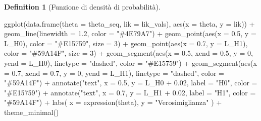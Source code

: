 \documentclass[
  letterpaper,
  DIV=11,
  numbers=noendperiod,
  oneside]{scrreprt}
\newenvironment{Shaded}{\begin{snugshade}}{\end{snugshade}}
\newcommand{\AttributeTok}[1]{\textcolor[rgb]{0.40,0.45,0.13}{#1}}
\newcommand{\DecValTok}[1]{\textcolor[rgb]{0.68,0.00,0.00}{#1}}
\newcommand{\FloatTok}[1]{\textcolor[rgb]{0.68,0.00,0.00}{#1}}
\newcommand{\FunctionTok}[1]{\textcolor[rgb]{0.28,0.35,0.67}{#1}}
\newcommand{\NormalTok}[1]{\textcolor[rgb]{0.00,0.23,0.31}{#1}}
\newcommand{\SpecialCharTok}[1]{\textcolor[rgb]{0.37,0.37,0.37}{#1}}
\newcommand{\StringTok}[1]{\textcolor[rgb]{0.13,0.47,0.30}{#1}}
\theoremstyle{definition}
\theoremstyle{plain}
\theoremstyle{definition}
\newtheorem{definition}{Definition}[chapter]
\theoremstyle{remark}
\begin{document}
\begin{definition}[Funzione di densità di
probabilità]
\begin{Shaded}
\begin{Highlighting}[]
\FunctionTok{ggplot}\NormalTok{(}\FunctionTok{data.frame}\NormalTok{(}\AttributeTok{theta =}\NormalTok{ theta\_seq, }\AttributeTok{lik =}\NormalTok{ lik\_vals), }\FunctionTok{aes}\NormalTok{(}\AttributeTok{x =}\NormalTok{ theta, }\AttributeTok{y =}\NormalTok{ lik)) }\SpecialCharTok{+}
  \FunctionTok{geom\_line}\NormalTok{(}\AttributeTok{linewidth =} \FloatTok{1.2}\NormalTok{, }\AttributeTok{color =} \StringTok{"\#4E79A7"}\NormalTok{) }\SpecialCharTok{+}
  \FunctionTok{geom\_point}\NormalTok{(}\FunctionTok{aes}\NormalTok{(}\AttributeTok{x =} \FloatTok{0.5}\NormalTok{, }\AttributeTok{y =}\NormalTok{ L\_H0), }\AttributeTok{color =} \StringTok{"\#E15759"}\NormalTok{, }\AttributeTok{size =} \DecValTok{3}\NormalTok{) }\SpecialCharTok{+}
  \FunctionTok{geom\_point}\NormalTok{(}\FunctionTok{aes}\NormalTok{(}\AttributeTok{x =} \FloatTok{0.7}\NormalTok{, }\AttributeTok{y =}\NormalTok{ L\_H1), }\AttributeTok{color =} \StringTok{"\#59A14F"}\NormalTok{, }\AttributeTok{size =} \DecValTok{3}\NormalTok{) }\SpecialCharTok{+}
  \FunctionTok{geom\_segment}\NormalTok{(}\FunctionTok{aes}\NormalTok{(}\AttributeTok{x =} \FloatTok{0.5}\NormalTok{, }\AttributeTok{xend =} \FloatTok{0.5}\NormalTok{, }\AttributeTok{y =} \DecValTok{0}\NormalTok{, }\AttributeTok{yend =}\NormalTok{ L\_H0),}
               \AttributeTok{linetype =} \StringTok{"dashed"}\NormalTok{, }\AttributeTok{color =} \StringTok{"\#E15759"}\NormalTok{) }\SpecialCharTok{+}
  \FunctionTok{geom\_segment}\NormalTok{(}\FunctionTok{aes}\NormalTok{(}\AttributeTok{x =} \FloatTok{0.7}\NormalTok{, }\AttributeTok{xend =} \FloatTok{0.7}\NormalTok{, }\AttributeTok{y =} \DecValTok{0}\NormalTok{, }\AttributeTok{yend =}\NormalTok{ L\_H1),}
               \AttributeTok{linetype =} \StringTok{"dashed"}\NormalTok{, }\AttributeTok{color =} \StringTok{"\#59A14F"}\NormalTok{) }\SpecialCharTok{+}
  \FunctionTok{annotate}\NormalTok{(}\StringTok{"text"}\NormalTok{, }\AttributeTok{x =} \FloatTok{0.5}\NormalTok{, }\AttributeTok{y =}\NormalTok{ L\_H0 }\SpecialCharTok{+} \FloatTok{0.02}\NormalTok{, }\AttributeTok{label =} \StringTok{"H0"}\NormalTok{, }\AttributeTok{color =} \StringTok{"\#E15759"}\NormalTok{) }\SpecialCharTok{+}
  \FunctionTok{annotate}\NormalTok{(}\StringTok{"text"}\NormalTok{, }\AttributeTok{x =} \FloatTok{0.7}\NormalTok{, }\AttributeTok{y =}\NormalTok{ L\_H1 }\SpecialCharTok{+} \FloatTok{0.02}\NormalTok{, }\AttributeTok{label =} \StringTok{"H1"}\NormalTok{, }\AttributeTok{color =} \StringTok{"\#59A14F"}\NormalTok{) }\SpecialCharTok{+}
  \FunctionTok{labs}\NormalTok{(}
    \AttributeTok{x =} \FunctionTok{expression}\NormalTok{(theta),}
    \AttributeTok{y =} \StringTok{"Verosimiglianza"}
\NormalTok{  ) }\SpecialCharTok{+}
  \FunctionTok{theme\_minimal}\NormalTok{()}
\end{Highlighting}
\end{Shaded}


\end{definition}
\end{document}
